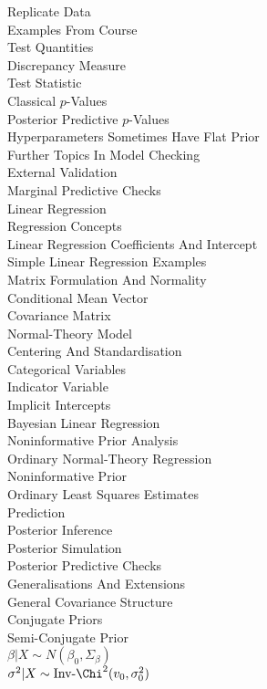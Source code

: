 Replicate Data \\
Examples From Course \\
Test Quantities \\
Discrepancy Measure \\
Test Statistic \\
Classical $p$-Values \\
Posterior Predictive $p$-Values \\
Hyperparameters Sometimes Have Flat Prior \\
Further Topics In Model Checking \\
External Validation \\
Marginal Predictive Checks \\
Linear Regression \\
Regression Concepts \\
Linear Regression Coefficients And Intercept \\
Simple Linear Regression Examples \\
Matrix Formulation And Normality \\
Conditional Mean Vector \\
Covariance Matrix \\
Normal-Theory Model \\
Centering And Standardisation \\
Categorical Variables \\
Indicator Variable \\
Implicit Intercepts \\
Bayesian Linear Regression \\
Noninformative Prior Analysis \\
Ordinary Normal-Theory Regression \\
Noninformative Prior \\
Ordinary Least Squares Estimates \\
Prediction \\
Posterior Inference \\
Posterior Simulation \\
Posterior Predictive Checks \\
Generalisations And Extensions \\
General Covariance Structure \\
Conjugate Priors \\
Semi-Conjugate Prior \\
$\beta|X \sim N(\beta_0,\Sigma_{\beta})$ \\
$\sigma^2|X \sim \text{Inv-}\Chi^2(v_0,\sigma_0^2)$ \\
